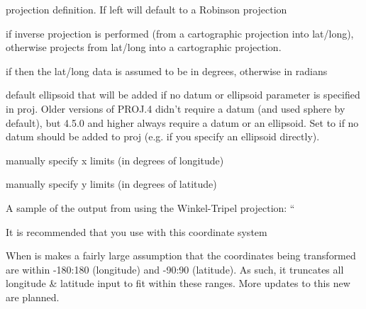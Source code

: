 \documentclass[a4paper]{book}
\begin{document}
\begin{Arguments}
\begin{ldescription}
\item[\code{proj}] projection definition. If left  will default to
a Robinson projection

\item[\code{inverse}] if  inverse projection is performed (from a
cartographic projection into lat/long), otherwise projects from
lat/long into a cartographic projection.

\item[\code{degrees}] if  then the lat/long data is assumed to be in
degrees, otherwise in radians

\item[\code{ellps.default}] default ellipsoid that will be added if no datum or
ellipsoid parameter is specified in proj. Older versions of PROJ.4
didn't require a datum (and used sphere by default), but 4.5.0 and
higher always require a datum or an ellipsoid. Set to   if no
datum should be added to proj (e.g. if you specify an ellipsoid
directly).

\item[\code{xlim}] manually specify x limits (in degrees of longitude)

\item[\code{ylim}] manually specify y limits (in degrees of latitude)
\end{ldescription}
\end{Arguments}
%
\begin{Details}



A sample of the output from  using the Winkel-Tripel projection:
``

\end{Details}
%
\begin{Note}
It is recommended that you use  with this coordinate system

When  is   makes a fairly
large assumption that the coordinates being transformed are within
-180:180 (longitude) and -90:90 (latitude). As such, it truncates
all longitude \& latitude input to fit within these ranges. More updates
to this new  are planned.
\end{Note}
%
\end{document}
